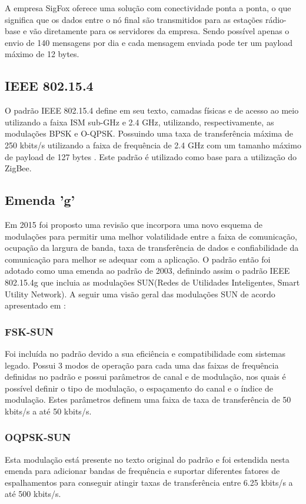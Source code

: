 A empresa SigFox oferece uma solução com conectividade ponta a ponta, o que significa que os dados entre o nó final são transmitidos para as estações rádio-base e vão diretamente para os servidores da empresa. Sendo possível apenas o envio de 140 mensagens por dia e cada mensagem enviada pode ter um payload máximo de 12 bytes.

\subsection{IEEE 802.15.4}
O padrão IEEE 802.15.4 define em seu texto, camadas físicas e de acesso ao meio utilizando a faixa ISM sub-GHz e 2.4 GHz, utilizando, respectivamente, as modulações BPSK e O-QPSK. Possuindo uma taxa de transferência máxima de 250 kbits/s utilizando a faixa de frequência de 2.4 GHz com um tamanho máximo de payload de 127 bytes \cite{munoz2018overview}\cite{gomes2017estimaccao}. Este padrão é utilizado como base para a utilização do ZigBee.

\subsection*{Emenda 'g'}
Em 2015 foi proposto uma revisão que incorpora uma novo esquema de modulações para permitir uma melhor volatilidade entre a faixa de comunicação, ocupação da largura de banda, taxa de transferência de dados e confiabilidade da comunicação para melhor se adequar com a aplicação. O padrão então foi adotado como uma emenda ao padrão de 2003, definindo assim o padrão IEEE 802.15.4g que incluia as modulações SUN(Redes de Utilidades Inteligentes, Smart Utility Network)\cite{tuset2020reliability}.
A seguir uma visão geral das modulações SUN de acordo apresentado em \cite{tuset2020reliability}:
\subsubsection*{FSK-SUN}
Foi incluída no padrão devido a sua eficiência e compatibilidade com sistemas legado. Possui 3 modos de operação para cada uma das faixas de frequência definidas no padrão e possui parâmetros de canal e de modulação, nos quais é possível definir o tipo de modulação, o espaçamento do canal e o índice de modulação. Estes parâmetros definem uma faixa de taxa de transferência de 50 kbits/s a até 50 kbits/s.
\subsubsection*{OQPSK-SUN}
Esta modulação está presente no texto original do padrão e foi estendida nesta emenda para adicionar bandas de frequência e suportar diferentes fatores de espalhamentos para conseguir atingir taxas de transferência entre 6.25 kbits/s a até 500 kbits/s.
